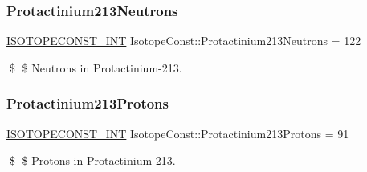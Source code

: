 \subsubsection{\texorpdfstring{Protactinium213\+Neutrons}{Protactinium213Neutrons}}
{\footnotesize\ttfamily \mbox{\hyperlink{group___isotope_const-_macros_ga5f18360b3e99483a35c32d789e62621c}{I\+S\+O\+T\+O\+P\+E\+C\+O\+N\+S\+T\+\_\+\+I\+NT}} Isotope\+Const\+::\+Protactinium213\+Neutrons = 122}

\$ \$ Neutrons in Protactinium-\/213. \mbox{\label{group___isotope_const-_protactinium-_pa213_gac7b41e4bb65e677a3f9e1b705931871b}} 
\subsubsection{\texorpdfstring{Protactinium213\+Protons}{Protactinium213Protons}}
{\footnotesize\ttfamily \mbox{\hyperlink{group___isotope_const-_macros_ga5f18360b3e99483a35c32d789e62621c}{I\+S\+O\+T\+O\+P\+E\+C\+O\+N\+S\+T\+\_\+\+I\+NT}} Isotope\+Const\+::\+Protactinium213\+Protons = 91}

\$ \$ Protons in Protactinium-\/213. 